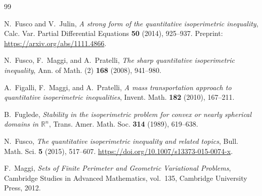 \documentclass[11pt]{amsart}
\theoremstyle{definition}
\newcommand{\R}{\mathbb R}
\begin{document}
\begin{thebibliography}{99}

N.~Fusco and V.~Julin,
\emph{A strong form of the quantitative isoperimetric inequality},
Calc. Var. Partial Differential Equations \textbf{50} (2014), 925--937.
Preprint: \url{https://arxiv.org/abs/1111.4866}.

N.~Fusco, F.~Maggi, and A.~Pratelli,
\emph{The sharp quantitative isoperimetric inequality},
Ann. of Math. (2) \textbf{168} (2008), 941--980.

A.~Figalli, F.~Maggi, and A.~Pratelli,
\emph{A mass transportation approach to quantitative isoperimetric
inequalities},
Invent. Math. \textbf{182} (2010), 167--211.

B.~Fuglede,
\emph{Stability in the isoperimetric problem for convex or nearly spherical
domains in \(\R^n\)},
Trans. Amer. Math. Soc. \textbf{314} (1989), 619--638.

N.~Fusco,
\emph{The quantitative isoperimetric inequality and related topics},
Bull. Math. Sci. \textbf{5} (2015), 517--607.
\url{https://doi.org/10.1007/s13373-015-0074-x}.

F.~Maggi,
\emph{Sets of Finite Perimeter and Geometric Variational Problems},
Cambridge Studies in Advanced Mathematics, vol.~135,
Cambridge University Press, 2012.

\end{thebibliography}
\end{document}
